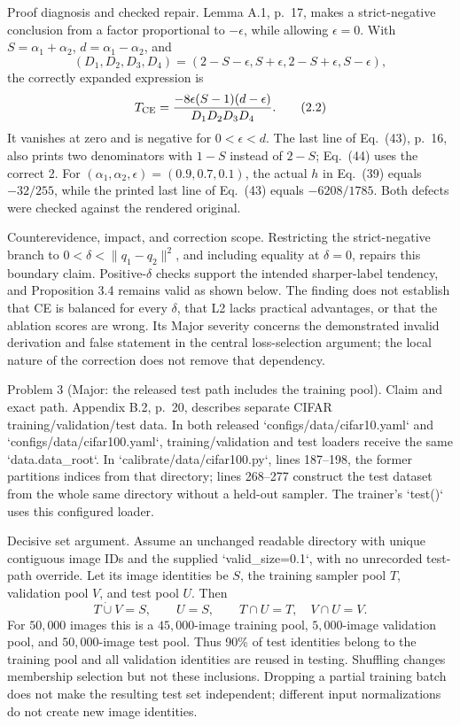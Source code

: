 \documentclass[10pt]{article}
\begin{document}
Proof diagnosis and checked repair. Lemma A.1, p. 17, makes a strict-negative conclusion from a factor proportional to \(-\epsilon\), while allowing \(\epsilon=0\). With \(S=\alpha_1+\alpha_2\), \(d=\alpha_1-\alpha_2\), and \[(D_1,D_2,D_3,D_4)=(2-S-\epsilon,S+\epsilon,2-S+\epsilon,S-\epsilon),\] the correctly expanded expression is \[T_{\rm CE}
 =\frac{-8\epsilon(S-1)(d-\epsilon)}{D_1D_2D_3D_4}.
 \tag{2.2}\] It vanishes at zero and is negative for \(0<\epsilon<d\). The last line of Eq. (43), p. 16, also prints two denominators with \(1-S\) instead of \(2-S\); Eq. (44) uses the correct 2. For \((\alpha_1,\alpha_2,\epsilon)=(0.9,0.7,0.1)\), the actual \(h\) in Eq. (39) equals \(-32/255\), while the printed last line of Eq. (43) equals \(-6208/1785\). Both defects were checked against the rendered original.\par
Counterevidence, impact, and correction scope. Restricting the strict-negative branch to \(0<\delta<\|q_1-q_2\|^2\), and including equality at \(\delta=0\), repairs this boundary claim. Positive-\(\delta\) checks support the intended sharper-label tendency, and Proposition 3.4 remains valid as shown below. The finding does not establish that CE is balanced for every \(\delta\), that L2 lacks practical advantages, or that the ablation scores are wrong. Its Major severity concerns the demonstrated invalid derivation and false statement in the central loss-selection argument; the local nature of the correction does not remove that dependency.\par
Problem 3 (Major: the released test path includes the training pool).  Claim and exact path. Appendix B.2, p. 20, describes separate CIFAR training/validation/test data. In both released `configs/data/cifar10.yaml` and `configs/data/cifar100.yaml`, training/validation and test loaders receive the same `data.data\_root`. In `calibrate/data/cifar100.py`, lines 187–198, the former partitions indices from that directory; lines 268–277 construct the test dataset from the whole same directory without a held-out sampler. The trainer’s `test()` uses this configured loader.\par
Decisive set argument. Assume an unchanged readable directory with unique contiguous image IDs and the supplied `valid\_size=0.1`, with no unrecorded test-path override. Let its image identities be \(S\), the training sampler pool \(T\), validation pool \(V\), and test pool \(U\). Then \[T\mathbin{\dot\cup}V=S,\qquad U=S,\qquad T\cap U=T,\quad V\cap U=V.\] For \(50{,}000\) images this is a \(45{,}000\)-image training pool, \(5{,}000\)-image validation pool, and \(50{,}000\)-image test pool. Thus 90\% of test identities belong to the training pool and all validation identities are reused in testing. Shuffling changes membership selection but not these inclusions. Dropping a partial training batch does not make the resulting test set independent; different input normalizations do not create new image identities.\par
\end{document}
